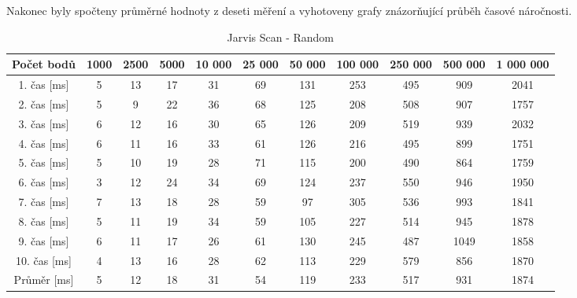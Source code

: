 \documentclass{article}
\begin{document}
Nakonec byly spočteny průměrné hodnoty z deseti měření a vyhotoveny grafy znázorňující průběh časové náročnosti.
\begin{center}
	\begin{table}[]
	\centering
	\caption{Jarvis Scan - Random}
	\label{my-label}
	\begin{tabular}{|c|c|c|c|c|c|c|c|c|c|c|}
		\hline 
 	Počet bodů&  1000& 2500 & 5000 & 10 000 & 25 000 & 50 000  & 100 000  & 250 000  & 500 000 & 1 000 000  \\ \hline \hline
 		1. čas [ms]&  5&  13&  17&  31& 69 &    131&  253&  495&  909&  2041\\ \hline
 		2. čas [ms]&  5&    9&  22&  36&  68&    125&  208&  508&  907&  1757\\ \hline
 		3. čas [ms]&  6&  12&  16&  30&  65&    126&  209&  519&  939&  2032\\ \hline
 		4. čas [ms]&  6&  11&  16&  33&  61&    126&  216&  495&  899&  1751\\ \hline
 		5. čas [ms]&  5&  10&  19&  28&  71&   115 &  200&  490&  864&  1759\\ \hline
 		6. čas [ms]&  3&  12&  24&  34&  69&    124&  237&  550&  946&  1950\\ \hline
 		7. čas [ms]&  7&  13&  18&  28&  59&      97&  305&  536&  993&  1841\\ \hline
 		8. čas [ms]&  5&  11&  19&  34&  59&    105&  227&  514&  945&  1878\\ \hline
 		9. čas [ms]&  6&  11&  17&  26&  61&    130&  245&  487&  1049&  1858\\ \hline
		10. čas [ms]& 4 & 13 &  16&  28&  62&  113&  229&  579&  856&  1870\\ \hline \hline
 		Průměr [ms]& 5& 12 &18  &31  &54  &119  &233  &517  &931  & 1874 \\ \hline
	\end{tabular}


\end{table}
\end{center}
\end{document}
